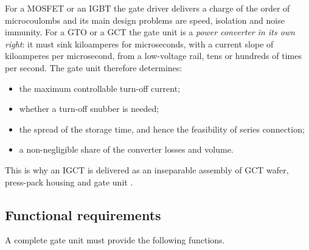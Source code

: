 For a MOSFET or an IGBT the gate driver delivers a charge of the order of
microcoulombs and its main design problems are speed, isolation and noise
immunity. For a GTO or a GCT the gate unit is a \emph{power converter in its own
right}: it must sink kiloamperes for microseconds, with a current slope of
kiloamperes per microsecond, from a low-voltage rail, tens or hundreds of times
per second. The gate unit therefore determines:

\begin{itemize}[nosep]
  \item the maximum controllable turn-off current;
  \item whether a turn-off snubber is needed;
  \item the spread of the storage time, and hence the feasibility of series
        connection;
  \item a non-negligible share of the converter losses and volume.
\end{itemize}

This is why an IGCT is delivered as an inseparable assembly of GCT wafer,
press-pack housing and gate unit \cite{carroll1997igct,abb5sya2032}.

\subsection{Functional requirements}

A complete gate unit must provide the following functions.

